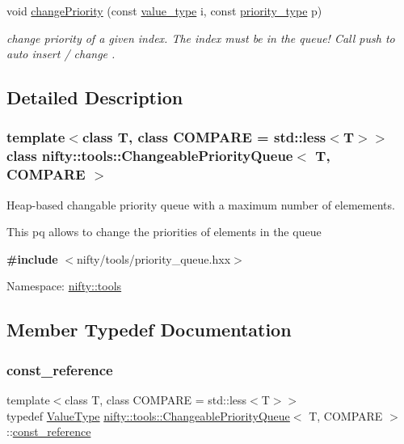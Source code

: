 \begin{DoxyCompactItemize}
void \hyperlink{classnifty_1_1tools_1_1ChangeablePriorityQueue_a5db5d4bd2d451623897e27c1aa5f8fff}{change\+Priority} (const \hyperlink{classnifty_1_1tools_1_1ChangeablePriorityQueue_aa00fbc748b94bdc6175b4c49bb2bba48}{value\+\_\+type} i, const \hyperlink{classnifty_1_1tools_1_1ChangeablePriorityQueue_a6ecafb387f99a1cfa7ff5795c924682c}{priority\+\_\+type} p)
\begin{DoxyCompactList}\small\item\em change priority of a given index. The index must be in the queue! Call push to auto insert / change . \end{DoxyCompactList}\end{DoxyCompactItemize}


\subsection{Detailed Description}
\subsubsection*{template$<$class T, class C\+O\+M\+P\+A\+RE = std\+::less$<$\+T$>$$>$\newline
class nifty\+::tools\+::\+Changeable\+Priority\+Queue$<$ T, C\+O\+M\+P\+A\+R\+E $>$}

Heap-\/based changable priority queue with a maximum number of elemements. 

This pq allows to change the priorities of elements in the queue

{\bfseries \#include} $<$nifty/tools/priority\+\_\+queue.\+hxx$>$~\newline


Namespace\+: \hyperlink{namespacenifty_1_1tools}{nifty\+::tools} 

\subsection{Member Typedef Documentation}
\mbox{\label{classnifty_1_1tools_1_1ChangeablePriorityQueue_acb7eb23bd9ca7c52955adc06bf4816c3}} 
\subsubsection{\texorpdfstring{const\+\_\+reference}{const\_reference}}
{\footnotesize\ttfamily template$<$class T, class C\+O\+M\+P\+A\+RE = std\+::less$<$\+T$>$$>$ \\
typedef \hyperlink{classnifty_1_1tools_1_1ChangeablePriorityQueue_a3b9e96ad70a62b02b4a117d58f758a1f}{Value\+Type} \hyperlink{classnifty_1_1tools_1_1ChangeablePriorityQueue}{nifty\+::tools\+::\+Changeable\+Priority\+Queue}$<$ T, C\+O\+M\+P\+A\+RE $>$\+::\hyperlink{classnifty_1_1tools_1_1ChangeablePriorityQueue_acb7eb23bd9ca7c52955adc06bf4816c3}{const\+\_\+reference}}


